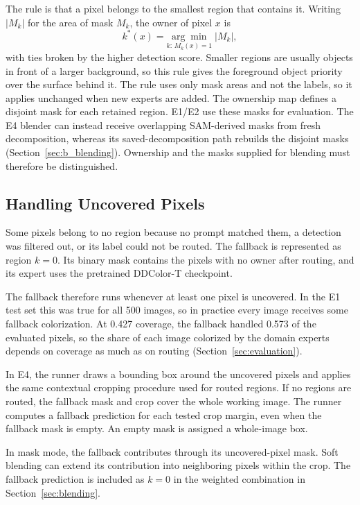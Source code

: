 \documentclass{FastFyp}
\begin{document}
The rule is that a pixel belongs to the smallest region that contains it. Writing $|M_k|$ for the area of mask $M_k$, the owner of pixel $x$ is
\begin{equation}
    k^{*}(x) = \underset{k:\,M_k(x)=1}{\arg\min}\; |M_k|,
\end{equation}
with ties broken by the higher detection score. Smaller regions are usually objects in front of a larger background, so this rule gives the foreground object priority over the surface behind it. The rule uses only mask areas and not the labels, so it applies unchanged when new experts are added. The ownership map defines a disjoint mask for each retained region. E1/E2 use these masks for evaluation. The E4 blender can instead receive overlapping SAM-derived masks from fresh decomposition, whereas its saved-decomposition path rebuilds the disjoint masks (Section~\ref{sec:b_blending}). Ownership and the masks supplied for blending must therefore be distinguished.

\subsection{Handling Uncovered Pixels}
\label{sec:fallback}

Some pixels belong to no region because no prompt matched them, a detection was
filtered out, or its label could not be routed. The fallback is represented as
region $k=0$. Its binary mask contains the pixels with no owner after routing,
and its expert uses the pretrained DDColor-T checkpoint.

The fallback therefore runs whenever at least one pixel is uncovered. In the E1
test set this was true for all 500 images, so in practice every image receives
some fallback colorization. At 0.427 coverage, the fallback handled 0.573 of the
evaluated pixels, so the share of each image colorized by the domain experts
depends on coverage as much as on routing (Section~\ref{sec:evaluation}).

In E4, the runner draws a bounding box around the uncovered pixels and applies
the same contextual cropping procedure used for routed regions. If no regions
are routed, the fallback mask and crop cover the whole working image. The runner
computes a fallback prediction for each tested crop margin, even when the
fallback mask is empty. An empty mask is assigned a whole-image box.

In mask mode, the fallback contributes through its uncovered-pixel mask.
Soft blending can extend its contribution into neighboring pixels within the
crop. The fallback prediction is included as $k=0$ in the weighted combination
in Section~\ref{sec:blending}.
\end{document}
